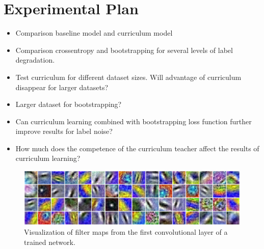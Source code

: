 \section{Experimental Plan}
\label{sec:experimentalPlan}
\begin{itemize}
\item Comparison baseline model and curriculum model
\item Comparison crossentropy and bootstrapping for several
levels of label degradation. 
\item Test curriculum for different dataset sizes. Will advantage of curriculum disappear for larger datasets?
\item Larger dataset for bootstrapping?
\item Can curriculum learning combined with bootstrapping loss function further improve results for label noise?
\item How much does the competence of the curriculum teacher affect the results of curriculum learning?
\end{itemize}

\begin{figure}
\begin{center}
\includegraphics[width=1\columnwidth]{figs/network/Filter_unblurred.png}
\caption[Visualization of filter map]{Visualization of filter maps from the first convolutional layer of a trained network.}
\label{fig:convoluional_first_layer_visualization}
\end{center}
\end{figure}

